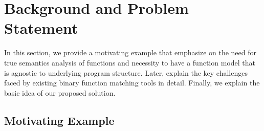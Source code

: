 
\section{Background and Problem Statement} \label{sec:prob_state}
In this section, we provide a motivating example that emphasize on the need for true semantics analysis of functions and necessity to have a function model that is agnostic to underlying program structure. Later, explain the key challenges 
faced by existing binary function matching tools in detail. Finally, we explain the basic idea of our proposed solution.


\subsection{Motivating Example}  \label{subsec:bin_pre}

